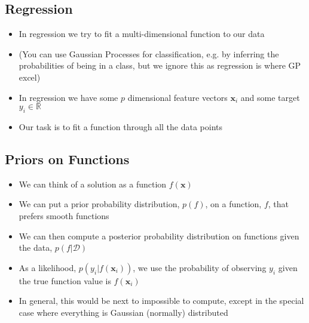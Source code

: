 
\begin{slide}
\section{Regression}

\begin{PauseHighLight}
  \begin{itemize}
  \item In regression we try to fit a multi-dimensional function to our
    data\pause
  \item (You can use Gaussian Processes for classification, e.g. by
    inferring the probabilities of being in a class, but we ignore this
    as regression is where GP excel)\pause
  \item In regression we have some $p$ dimensional feature vectors
    $\bm{x}_i$ and some target $y_i \in \mathbb{R}$\pause
  \item Our task is to fit a function through all the data points\pause
  \end{itemize}
\end{PauseHighLight}

\end{slide}

\begin{slide}
\section{Priors on Functions}

\begin{PauseHighLight}
  \begin{itemize}
  \item We can think of a solution as a function $f(\bm{x})$\pause
  \item We can put a prior probability distribution, $p(f)$, on a
    function, $f$, that prefers smooth functions\pause
  \item We can then compute a posterior probability distribution on
    functions given the data, $p(f|\mathcal{D})$\pause
  \item As a likelihood, $p\left(y_i|f(\bm{x}_i)\right)$, we use the
    probability of observing $y_i$ given the true function value is
    $f(\bm{x}_i)$\pause
  \item In general, this would be next to impossible to compute\pause,
    except in the special case where everything is Gaussian (normally)
    distributed\pauseb
  \end{itemize}
\end{PauseHighLight}

\end{slide}

